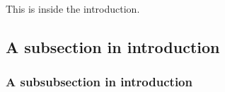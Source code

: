 \documentclass[../../master.tex]{subfiles}
\begin{document}
This is inside the introduction.

\subsection{A subsection in introduction}

\subsubsection{A subsubsection in introduction}
\end{document}
